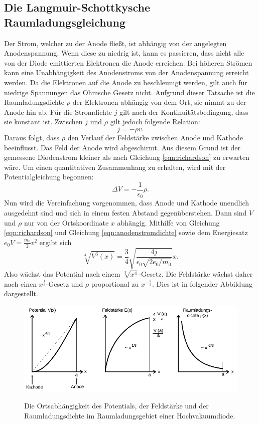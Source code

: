 \subsection{Die Langmuir-Schottkysche Raumladungsgleichung}
\label{sec:langmuirschottky}
Der Strom, welcher zu der Anode fließt, ist abhängig von der angelegten
Anodenspannung. Wenn diese zu niedrig ist, kann es passieren, dass nicht alle
von der Diode emittierten Elektronen die Anode erreichen. Bei höheren Strömen
kann eine Unabhängigkeit des Anodenstroms von der Anodenspannung erreicht werden.
Da die Elektronen auf die Anode zu beschleunigt werden, gilt auch für niedrige
Spannungen das Ohmsche Gesetz nicht. Aufgrund dieser Tatsache ist die
Raumladungsdichte $\rho$ der Elektronen abhängig von dem Ort, sie nimmt zu der
Anode hin ab. Für die Stromdichte $j$ gilt nach der Kontinuitätsbedingung, dass
sie konstant ist. Zwischen $j$ und $\rho$ gilt jedoch folgende Relation:
\begin{equation}
  j = -\rho v.
  \label{eqn:anodenstromdichte}
\end{equation}
Daraus folgt, dass $\rho$ den Verlauf der Feldstärke zwischen Anode und Kathode
beeinflusst. Das Feld der Anode wird abgeschirmt. Aus diesem Grund ist der
gemessene Diodenstrom kleiner als nach Gleichung \eqref{eqn:richardson} zu
erwarten wäre.
Um einen quantitativen Zusammenhang zu erhalten, wird mit der Potentialgleichung
begonnen:
\begin{equation}
  \Delta V = -\frac{1}{\epsilon_0} \rho.
  \label{eqn:Potentialgleichung}
\end{equation}
Nun wird die Vereinfachung vorgenommen, dass Anode und Kathode unendlich ausgedehnt
sind und sich in einem festen Abstand gegenüberstehen. Dann sind $V$ und $\rho$
nur von der Ortskoordinate $x$ abhängig. Mithilfe von Gleichung
\eqref{eqn:richardson} und Gleichung \eqref{eqn:anodenstromdichte} sowie dem
Energiesatz $e_0 V = \frac{m_0}{2} v^2$ ergibt sich
\begin{equation}
  \sqrt[4]{V^3(x)} = \frac{3}{4} \sqrt{\frac{4 j}{\epsilon_0 \sqrt{2 e_0/m_0}}}x.
  \label{eqn:gleichung11}
\end{equation}
Also wächst das Potential nach einem $\sqrt[3]{x^4}$-Gesetz. Die Feldstärke
wächst daher nach einen $x^{\frac{1}{3}}$-Gesetz und $\rho$ proportional zu
$x^{-\frac{2}{3}}$. Dies ist in folgender Abbildung dargestellt.
\begin{figure}[H]
  \centering
  \includegraphics[scale=0.5]{content/langmuirschottky.png}
  \label{fig:langmuirschottky1}
  \caption{Die Ortsabhängigkeit des Potentials, der Feldstärke und der
  Raumladungsdichte im Raumladungsgebiet einer Hochvakuumdiode. \cite{AP01}}
\end{figure}
